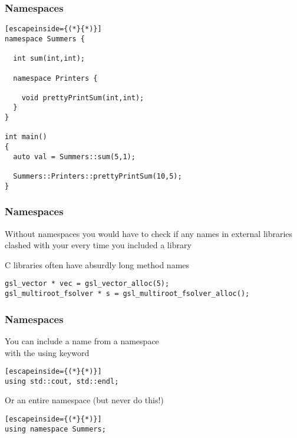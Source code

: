 \documentclass[14pt,a4paper,dvipsnames,usenames]{beamer}
\begin{document}
\begin{frame}[fragile]
  \frametitle{Namespaces}

\begin{lstlisting}[escapeinside={(*}{*)}]
namespace Summers {

  int sum(int,int);

  namespace Printers {

    void prettyPrintSum(int,int);
  }
}

int main()
{
  auto val = Summers::sum(5,1);

  Summers::Printers::prettyPrintSum(10,5);
}
\end{lstlisting}
  
\end{frame}

\begin{frame}[fragile]
  \frametitle{Namespaces}

  Without namespaces you would have to check if any names in external libraries
  clashed with your every time you included a library

  \vspace{1em}
  C libraries often have absurdly long method names

  \vspace{1em}
  \begin{lstlisting}
gsl_vector * vec = gsl_vector_alloc(5);
gsl_multiroot_fsolver * s = gsl_multiroot_fsolver_alloc();
  \end{lstlisting}
  
\end{frame}

\begin{frame}[fragile]
  \frametitle{Namespaces}

  You can include a name from a namespace\\with the {\color{FeebleWeek}using} keyword

  \vspace{.5em}
  \begin{lstlisting}[escapeinside={(*}{*)}]
using std::cout, std::endl;
  \end{lstlisting}

  \vspace{1em}
  Or an entire namespace {\color{Marty}(but never do this!)}

  \begin{lstlisting}[escapeinside={(*}{*)}]
using namespace Summers;
  \end{lstlisting}
  
\end{frame}
\end{document}
